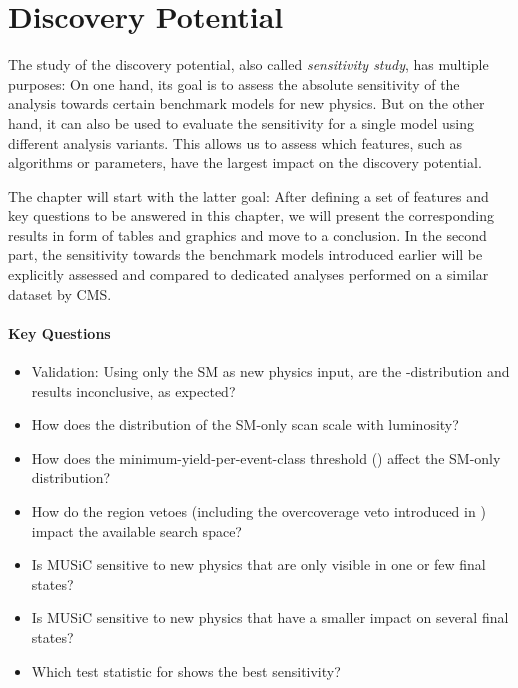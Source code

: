 
\newcommand{\lumiA}{\SI{2.3}{\per\femto\barn}}
\newcommand{\lumiB}{\SI{35.9}{\per\femto\barn}}

\chapter{Discovery Potential}
\label{chap:sensitivity_studies}

The study of the discovery potential, also called \emph{sensitivity study}, has multiple purposes: On one hand, its goal is to assess the absolute sensitivity of the analysis towards certain benchmark models for new physics. But on the other hand, it can also be used to evaluate the sensitivity for a single model using different analysis variants. This allows us to assess which features, such as algorithms or parameters, have the largest impact on the discovery potential.

The chapter will start with the latter goal: After defining a set of features and key questions to be answered in this chapter, we will present the corresponding results in form of tables and graphics and move to a conclusion. 
In the second part, the sensitivity towards the benchmark models introduced earlier will be explicitly assessed and compared to dedicated analyses performed on a similar dataset by \ac{CMS}.

\subsubsection{Key Questions}
\begin{itemize}
    \item Validation: Using only the \ac{SM} as new physics input, are the \ptilde-distribution and \phat results inconclusive, as expected?
    \item How does the \ptilde distribution of the \ac{SM}-only scan scale with luminosity?
    \item How does the minimum-yield-per-event-class threshold () affect the \ac{SM}-only distribution?
    \item How do the region vetoes (including the overcoverage veto introduced in ) impact the available search space?
    \item Is \ac{MUSiC} sensitive to new physics that are only visible in one or few final states?
    \item Is \ac{MUSiC} sensitive to new physics that have a smaller impact on several final states?    
    \item Which test statistic for \phat shows the best sensitivity?
\end{itemize}

